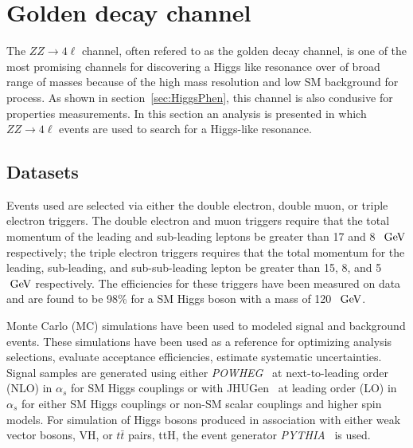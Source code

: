 \def\cm{\hbox{$\;\hbox{\rm cm}$}}
\def\eV{\hbox{$\;\hbox{\rm eV}$}}
\def\GeV{\hbox{$\;\hbox{\rm GeV}$}}
\def\MeV{\hbox{$\;\hbox{\rm MeV}$}}
\def\TeV{\hbox{$\;\hbox{\rm TeV}$}}
\def\ifb{\hbox{$fb^{-1}\rm$}}

\def\POWHEG{{\it POWHEG}}
\def\JHUGen{{\it JHUGen}}
\def\MCFM{{\it MCFM}}
\def\PYTHIA{{\it PYTHIA}}
\def\MADGRAPH{{\it MADGRAPH}}
\def\GEANTfour{{\it GEANT4}}

\newcommand{\KD}{$\mathscr{D}^{\rm kin}_{\rm bkg}$}
\newcommand{\superKD}{$\mathscr{D}_{\rm bkg}$}
\newcommand{\spinKD}{$\mathscr{D}_{J^P}$}
\newcommand{\pt}{$p_{T}$}
\newcommand{\sip}{$SIP_{3D}$}
\newcommand{\isocomb}{$ISO_{comb}$}


\section{Golden decay channel}

The $ZZ\to 4\ell$ channel, often refered to as the golden decay 
channel, is one of the most promising channels for discovering a 
Higgs like resonance over of broad range of masses because of 
the high mass resolution and low SM background for process.  As 
shown in section~\ref{sec:HiggsPhen}, this channel is also condusive
for properties measurements.  In this section an analysis is presented
in which $ZZ\to 4\ell$ events are used to search for a Higgs-like 
resonance.  

\subsection{Datasets}

Events used are selected via either the
double electron, double muon, or triple electron triggers.  The
double electron and muon triggers require that the total momentum
of the leading and sub-leading leptons be greater than 17 and 
8~\GeV respectively; the triple electron triggers requires that
the total momentum for the leading, sub-leading, and 
sub-sub-leading lepton be greater than 15, 8, and 5~\GeV 
respectively.  The efficiencies for these triggers have been 
measured on data and are found to be 98\% for a SM Higgs boson 
with a mass of 120~\GeV.  

Monte Carlo (MC) simulations have been used to modeled signal 
and background events.  These simulations have been used as a
reference for optimizing analysis selections, evaluate acceptance
efficiencies, estimate systematic uncertainties.  Signal samples
are generated using either \POWHEG~\cite{???} at next-to-leading 
order (NLO) in $\alpha_s$ for SM Higgs couplings or with 
JHUGen~\cite{???} at leading order (LO) in $\alpha_s$ for either
SM Higgs couplings or non-SM scalar couplings and higher spin
models.  For simulation of Higgs bosons produced in association
with either weak vector bosons, VH, or $t\bar{t}$ pairs, ttH, 
the event generator \PYTHIA~\cite{???} is used.  

